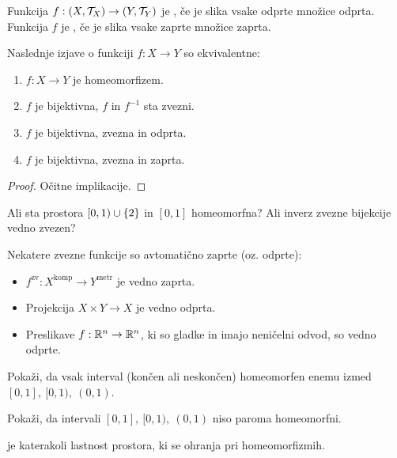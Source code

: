 \begin{definicija}
    Funkcija $f: (X, \mathcal{T}_X) \to (Y, \mathcal{T}_Y)$ je , če je slika vsake odprte množice odprta. Funkcija $f$ je , če je slika vsake zaprte množice zaprta.
\end{definicija}

\begin{trditev}
    Naslednje izjave o funkciji $f: X \to Y$ so ekvivalentne:
    \begin{enumerate}
        \item $f: X \to Y$ je homeomorfizem.
        \item $f$ je bijektivna, $f$ in $f^{-1}$ sta zvezni.
        \item $f$ je bijektivna, zvezna in odprta.
        \item $f$ je bijektivna, zvezna in zaprta.
    \end{enumerate}
\end{trditev}

\begin{proof}
    Očitne implikacije.
\end{proof}

\begin{primer} 
    Ali sta prostora $[0, 1) \cup \left\{2\right\}$ in $[0,1]$ homeomorfna? Ali inverz zvezne bijekcije vedno zvezen?
\end{primer}

\newpage
\begin{trditev}
    Nekatere zvezne funkcije so avtomatično zaprte (oz. odprte):
    \begin{itemize}
        \item $f^{\text{zv}}: X^{\text{komp}} \to Y^{\text{metr}}$ je vedno zaprta.
        \item Projekcija $X \times Y \to X$ je vedno odprta.
        \item Preslikave $f: \mathbb{R}^n \to \mathbb{R}^n$, ki so gladke in imajo neničelni odvod, so vedno odprte.
    \end{itemize}
\end{trditev}

\begin{primer}
    Pokaži, da vsak interval (končen ali neskončen) homeomorfen enemu izmed $[0,1], \ [0, 1), \ (0,1)$.

    Pokaži, da intervali $[0,1], \ [0, 1), \ (0,1)$ niso paroma homeomorfni.
\end{primer}

\begin{definicija}
     je katerakoli lastnost prostora, ki se ohranja pri homeomorfizmih.
\end{definicija}

